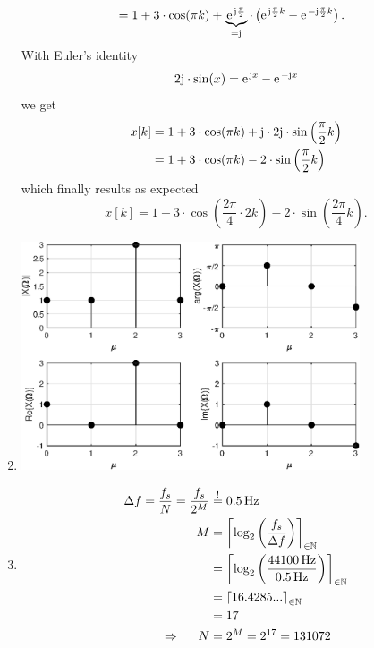 \documentclass[11pt,a4paper,DIV=12]{scrartcl}
\begin{document}
\begin{Loesung}
\begin{enumerate}[label=\alph*)]
\begin{align}
	&=1+3\cdot\cos(\pi k)+\underbrace{\e^{\im\frac{\pi}{2}}}_{=\im}\cdot\left(\e^{\im\frac{\pi}{2}k}-\e^{-\im\frac{\pi}{2}k}\right).\nonumber
	\end{align}
 With Euler's identity
	\begin{equation}
	2\im\cdot\sin(x)=\e^{\im x}-\e^{-\im x}\nonumber
	\end{equation}
	we get
	\begin{align}
	x[k]&=1+3\cdot\cos(\pi k)+\im\cdot2\im\cdot\sin\left(\frac{\pi}{2}k\right)\nonumber\\
	&=1+3\cdot\cos(\pi k)-2\cdot\sin\left(\frac{\pi}{2}k\right)\nonumber
	\end{align}
	which finally results as expected
	\begin{equation}
	x[k]=1+3\cdot\cos\left(\frac{2\pi}{4}\cdot2k\right)-2\cdot\sin\left(\frac{2\pi}{4}k\right).\nonumber
	\end{equation}
	\item \text{}
	\begin{center}%
		\includegraphics[width=10cm]{graphics/UE1_Exercise2_IDFT}%
	\end{center}%
	\item \begin{align}
	\Delta f=\frac{f_s}{N}=\frac{f_s}{2^M}&\stackrel{!}{=}0.5\,\text{Hz}\nonumber\\
	M&=\left\lceil\log_{2}\left(\frac{f_s}{\Delta f}\right)\right\rceil_{\in\mathbb{N}}\nonumber\\
	&=\left\lceil\log_{2}\left(\frac{44100\,\text{Hz}}{0.5\,\text{Hz}}\right)\right\rceil_{\in\mathbb{N}}\nonumber\\
	&=\left\lceil16.4285...\right\rceil_{\in\mathbb{N}}\nonumber\\
	&=17\nonumber\\
	\Rightarrow\hspace{5mm} N&=2^M=2^{17}=131072\nonumber

\end{align}
\end{enumerate}
\end{Loesung}
\end{document}
